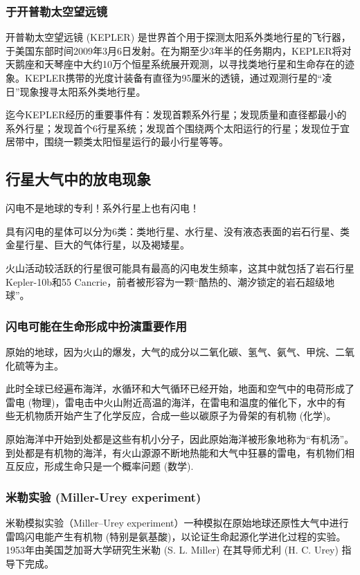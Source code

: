\documentclass[12pt,a4paper]{article}
\begin{document}
	\subsubsection{于开普勒太空望远镜}
	
	开普勒太空望远镜 (KEPLER) 是世界首个用于探测太阳系外类地行星的飞行器，于美国东部时间2009年3月6日发射。在为期至少3年半的任务期内，KEPLER将对天鹅座和天琴座中大约10万个恒星系统展开观测，以寻找类地行星和生命存在的迹象。KEPLER携带的光度计装备有直径为95厘米的透镜，通过观测行星的“凌日”现象搜寻太阳系外类地行星。
	
	迄今KEPLER经历的重要事件有：发现首颗系外行星；发现质量和直径都最小的系外行星；发现首个6行星系统；发现首个围绕两个太阳运行的行星；发现位于宜居带中，围绕一颗类太阳恒星运行的最小行星等等。
	
	\subsection{行星大气中的放电现象}
	
	闪电不是地球的专利！系外行星上也有闪电！
	
	具有闪电的星体可以分为6类：类地行星、水行星、没有液态表面的岩石行星、类金星行星、巨大的气体行星，以及褐矮星。
	
	火山活动较活跃的行星很可能具有最高的闪电发生频率，这其中就包括了岩石行星Kepler-10b和55 Cancrie，前者被形容为一颗“酷热的、潮汐锁定的岩石超级地球”。
	
	\subsubsection{闪电可能在生命形成中扮演重要作用}
	
	原始的地球，因为火山的爆发，大气的成分以二氧化碳、氢气、氨气、甲烷、二氧化硫等为主。
	
	此时全球已经遍布海洋，水循环和大气循环已经开始，地面和空气中的电荷形成了雷电 (物理)，雷电击中火山附近高温的海洋，在雷电和温度的催化下，水中的有些无机物质开始产生了化学反应，合成一些以碳原子为骨架的有机物 (化学)。
	
	原始海洋中开始到处都是这些有机小分子，因此原始海洋被形象地称为“有机汤”。到处都是有机物的海洋，有火山源源不断地热能和大气中狂暴的雷电，有机物们相互反应，形成生命只是一个概率问题 (数学).
	
	\subsubsection{米勒实验 (Miller-Urey experiment)}
	
	米勒模拟实验（Miller–Urey experiment）一种模拟在原始地球还原性大气中进行雷鸣闪电能产生有机物 (特别是氨基酸)，以论证生命起源化学进化过程的实验。1953年由美国芝加哥大学研究生米勒 (S. L. Miller) 在其导师尤利 (H. C. Urey) 指导下完成。
	
\end{document}

